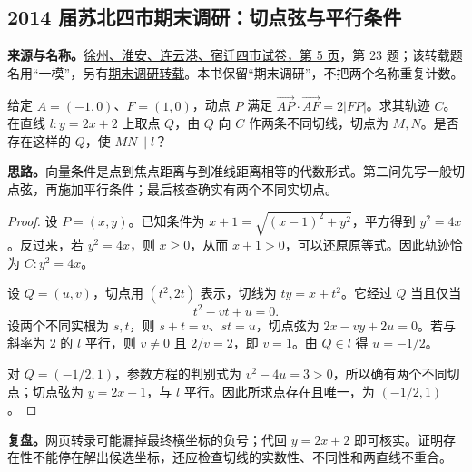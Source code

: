 \documentclass[UTF8,12pt,a4paper,fontset=fandol]{ctexart}
\begin{document}
\subsection{2014 届苏北四市期末调研：切点弦与平行条件}\label{sec:c2014sb}
\textbf{来源与名称。}\href{https://doc.xuehai.net/b24b27f9a1f1345ca980b6ebe-5.html}{徐州、淮安、连云港、宿迁四市试卷，第 5 页}，第 23 题；该转载题名用“一模”，另有\href{https://www.mianfeiwendang.com/doc/e71df5c172c3e51967676141}{期末调研转载}。本书保留“期末调研”，不把两个名称重复计数。
\begin{example}[题意]
给定 $A=(-1,0)$、$F=(1,0)$，动点 $P$ 满足 $\overrightarrow{AP}\cdot\overrightarrow{AF}=2|FP|$。求其轨迹 $C$。在直线 $l:y=2x+2$ 上取点 $Q$，由 $Q$ 向 $C$ 作两条不同切线，切点为 $M,N$。是否存在这样的 $Q$，使 $MN\parallel l$？
\end{example}
\textbf{思路。}向量条件是点到焦点距离与到准线距离相等的代数形式。第二问先写一般切点弦，再施加平行条件；最后核查确实有两个不同实切点。
\begin{proof}
设 $P=(x,y)$。已知条件为 $x+1=\sqrt{(x-1)^2+y^2}$，平方得到 $y^2=4x$。反过来，若 $y^2=4x$，则 $x\geq0$，从而 $x+1>0$，可以还原原等式。因此轨迹恰为 $C:y^2=4x$。

设 $Q=(u,v)$，切点用 $(t^2,2t)$ 表示，切线为 $ty=x+t^2$。它经过 $Q$ 当且仅当
\[
t^2-vt+u=0.
\]
设两个不同实根为 $s,t$，则 $s+t=v$、$st=u$，切点弦为 $2x-vy+2u=0$。若与斜率为 $2$ 的 $l$ 平行，则 $v\ne0$ 且 $2/v=2$，即 $v=1$。由 $Q\in l$ 得 $u=-1/2$。

对 $Q=(-1/2,1)$，参数方程的判别式为 $v^2-4u=3>0$，所以确有两个不同切点；切点弦为 $y=2x-1$，与 $l$ 平行。因此所求点存在且唯一，为 $(-1/2,1)$。
\end{proof}
\textbf{复盘。}网页转录可能漏掉最终横坐标的负号；代回 $y=2x+2$ 即可核实。证明存在性不能停在解出候选坐标，还应检查切线的实数性、不同性和两直线不重合。
\end{document}
